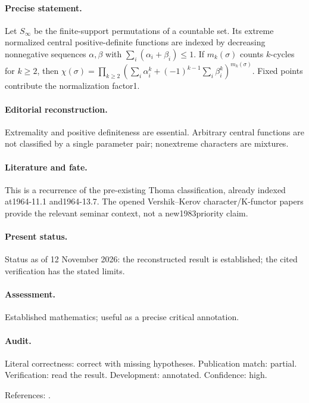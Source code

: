 \paragraph{Precise statement.} Let $S_\infty$ be the finite-support permutations of a countable set. Its extreme normalized central positive-definite functions are indexed by decreasing nonnegative sequences $\alpha,\beta$ with $\sum_i(\alpha_i+\beta_i)\le1$. If $m_k(\sigma)$ counts $k$-cycles for $k\ge2$, then $\chi(\sigma)=\prod_{k\ge2}(\sum_i\alpha_i^k+(-1)^{k-1}\sum_i\beta_i^k)^{m_k(\sigma)}$. Fixed points contribute the normalization factor1.

\paragraph{Editorial reconstruction.} Extremality and positive definiteness are essential. Arbitrary central functions are not classified by a single parameter pair; nonextreme characters are mixtures.

\paragraph{Literature and fate.} This is a recurrence of the pre-existing Thoma classification, already indexed at1964-11.1 and1964-13.7. The opened Vershik--Kerov character/K-functor papers provide the relevant seminar context, not a new1983priority claim.

\paragraph{Present status.} Status as of 12 November 2026: the reconstructed result is established; the cited verification has the stated limits.

\paragraph{Assessment.} Established mathematics; useful as a precise critical annotation.

\paragraph{Audit.} Literal correctness: correct with missing hypotheses. Publication match: partial. Verification: read the result. Development: annotated. Confidence: high.

\noindent References: \citep{vershikkerov1982unitary,vershikkerov1983kfunctor}.\par

